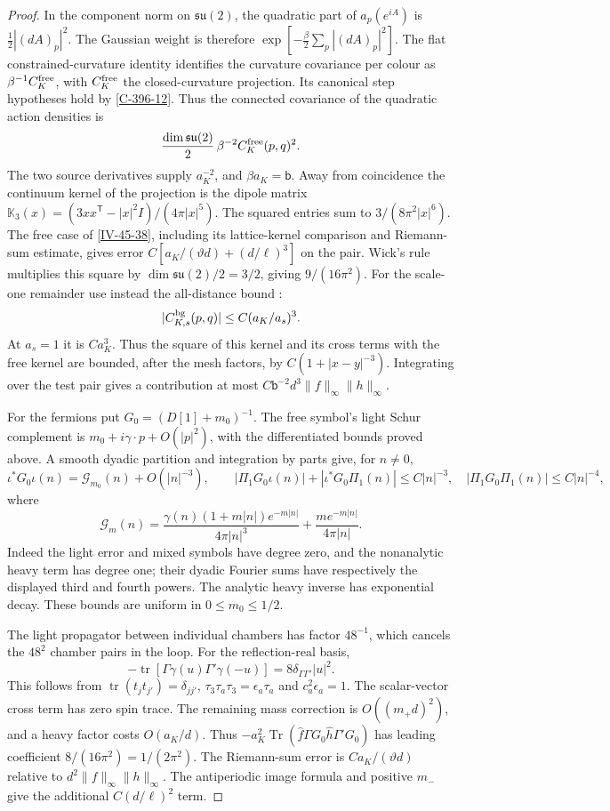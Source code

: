 \documentclass[11pt,letterpaper,reqno]{amsart}
\theoremstyle{definition}
\theoremstyle{remark}
\begin{document}
\begin{proof}
In the component norm on $\mathfrak{su}(2)$, the quadratic
part of $a_p(e^{iA})$ is $\frac12|(dA)_p|^2$.
The Gaussian weight is therefore
$\exp[-\frac\beta2\sum_p|(dA)_p|^2]$.
The flat constrained-curvature identity
\cite[Prop.~7.3]{YMM1} identifies the curvature covariance
per colour as $\beta^{-1}C_K^{\rm free}$, with
$C_K^{\rm free}$ the closed-curvature projection. Its canonical
step hypotheses hold by \cref{C-396-12}. Thus the connected
covariance of the quadratic action densities is
\[
 \frac{\dim\mathfrak{su}(2)}{2}\,
             \beta^{-2}C_K^{\rm free}(p,q)^2.
\]
The two source derivatives supply $a_K^{-2}$, and
$\beta a_K=\mathsf b$. Away from coincidence the continuum
kernel of the projection is the dipole matrix
$\mathbb K_3(x)=(3xx^{\mathsf T}-|x|^2I)/(4\pi|x|^5)$.
The squared entries sum to $3/(8\pi^2|x|^6)$.
The free case of \cref{IV-45-38}, including
its lattice-kernel comparison and Riemann-sum estimate, gives error $C[a_K/(\vartheta d)+(d/\ell)^3]$ on the pair.
Wick's rule multiplies this square by $\dim\mathfrak{su}(2)/2=3/2$,
giving $9/(16\pi^2)$.
For the scale-one remainder use instead the all-distance bound
\cite[Prop.~7.5]{YMM1}:
\[
 |C^{\rm bg}_{K,s}(p,q)|\le C(a_K/a_s)^3.
\]
At $a_s=1$ it is $Ca_K^3$. Thus the square of this kernel
and its cross terms with the free kernel are bounded, after
the mesh factors, by $C(1+|x-y|^{-3})$. Integrating over
the test pair gives a contribution at most
$C\mathsf b^{-2}d^3\|f\|_\infty\|h\|_\infty$.

For the fermions put $G_0=(D[1]+m_0)^{-1}$.
The free symbol's light Schur complement is
$m_0+i\gamma\cdot p+O(|p|^2)$, with the differentiated bounds
proved above. A smooth dyadic partition and integration by parts
give, for $n\ne0$,
\[
 \iota^*G_0\iota(n)=\mathscr G_{m_0}(n)+O(|n|^{-3}),\qquad
 |\Pi_1G_0\iota(n)|+|\iota^*G_0\Pi_1(n)|\le C|n|^{-3},
 \quad |\Pi_1G_0\Pi_1(n)|\le C|n|^{-4},
\]
where
\[
 \mathscr G_m(n)=\frac{\gamma(n)(1+m|n|)e^{-m|n|}}{4\pi|n|^3}
                          +\frac{m e^{-m|n|}}{4\pi|n|}.
\]
Indeed the light error and mixed symbols have degree zero, and
the nonanalytic heavy term has degree one; their dyadic Fourier
sums have respectively the displayed third and fourth powers.
The analytic heavy inverse has exponential decay. These bounds
are uniform in $0\le m_0\le1/2$.

The light propagator between individual chambers has factor
$48^{-1}$, which cancels the $48^2$ chamber pairs in the loop.
For the reflection-real basis,
\[
 -\operatorname{tr}[\Gamma\gamma(u)\Gamma'\gamma(-u)]
                         =8\delta_{\Gamma\Gamma'}|u|^2.
\]
This follows from $\operatorname{tr}(t_jt_{j'})=\delta_{jj'}$,
$\tau_3\tau_a\tau_3=\epsilon_a\tau_a$ and $c_a^2\epsilon_a=1$.
The scalar-vector cross term has zero spin trace. The remaining
mass correction is $O((m_+d)^2)$, and a heavy factor costs
$O(a_K/d)$. Thus
$-a_K^2\operatorname{Tr}(\hat f\Gamma G_0\hat h\Gamma'G_0)$
has leading coefficient $8/(16\pi^2)=1/(2\pi^2)$.
The Riemann-sum error is $C a_K/(\vartheta d)$ relative to
$d^2\|f\|_\infty\|h\|_\infty$.
The antiperiodic image formula and positive $m_-$ give
the additional $C(d/\ell)^2$ term.


\end{proof}
\end{document}
